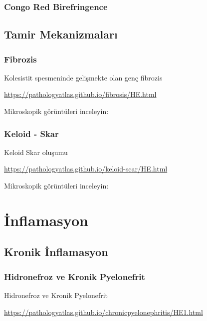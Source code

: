 \documentclass[
  letterpaper,
  DIV=11,
  numbers=noendperiod]{scrreprt}
\begin{document}
\hypertarget{congo-red-birefringence}{%
\section{Congo Red Birefringence}\label{congo-red-birefringence}}

\hypertarget{tamir-mekanizmalarux131}{%
\chapter{Tamir Mekanizmaları}\label{tamir-mekanizmalarux131}}

\hypertarget{fibrozis}{%
\section{Fibrozis}\label{fibrozis}}

Kolesistit spesmeninde gelişmekte olan genç fibrozis

\url{https://pathologyatlas.github.io/fibrosis/HE.html}

Mikroskopik görüntüleri inceleyin:

\hypertarget{keloid---skar}{%
\section{Keloid - Skar}\label{keloid---skar}}

Keloid Skar oluşumu

\url{https://pathologyatlas.github.io/keloid-scar/HE.html}

Mikroskopik görüntüleri inceleyin:

\part{İnflamasyon}

\hypertarget{kronik-inflamasyon}{%
\chapter{Kronik İnflamasyon}\label{kronik-inflamasyon}}

\hypertarget{hidronefroz-ve-kronik-pyelonefrit}{%
\section{Hidronefroz ve Kronik
Pyelonefrit}\label{hidronefroz-ve-kronik-pyelonefrit}}

Hidronefroz ve Kronik Pyelonefrit

\url{https://pathologyatlas.github.io/chronicpyelonephritis/HE1.html}
\end{document}
